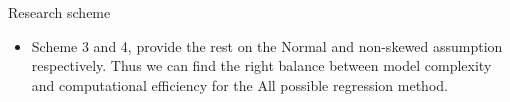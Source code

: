 \begin{frame}{Research scheme}
  \begin{itemize}
    \item Scheme 3 and 4, provide the  rest on the Normal and non-skewed assumption respectively. Thus we can find the right balance between model complexity and computational efficiency for the All possible regression method.
  \end{itemize}
\end{frame}


